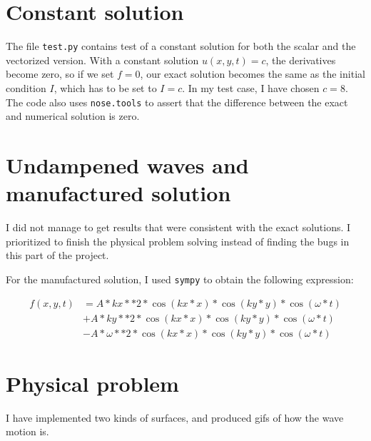 \documentclass[10pt, a4paper]{amsart}
\numberwithin{figure}{section}
\numberwithin{table}{section}
\begin{document}
\section{Constant solution}

The file \texttt{test.py} contains test of a constant solution for both the
scalar and the vectorized version. With a constant solution $u(x,y,t) = c$, the derivatives
become zero, so if we set $f = 0$, our exact solution becomes the same as the
initial condition $I$, which has to be set to $I=c$. In my test case, I have
chosen $c=8$. The code also uses \texttt{nose.tools} to assert that the
difference between the exact and numerical solution is zero.


\section{Undampened waves and manufactured solution}

I did not manage to get results that were consistent with the exact solutions.
I prioritized to finish the physical problem solving instead of finding the
bugs in this part of the project.

For the manufactured solution, I used \texttt{sympy} to obtain the following
expression:

\begin{align}
    f(x, y, t) &= A*kx**2*\cos(kx*x)*\cos(ky*y)*\cos(\omega*t)\\
    & + A*ky**2*\cos(kx*x)*\cos(ky*y)*\cos(\omega*t) \\
    &-A*\omega**2*\cos(kx*x)*\cos(ky*y)*\cos(\omega*t)
\end{align}

\section{Physical problem}

I have implemented two kinds of surfaces, and produced gifs of how the wave
motion is.
\end{document}
